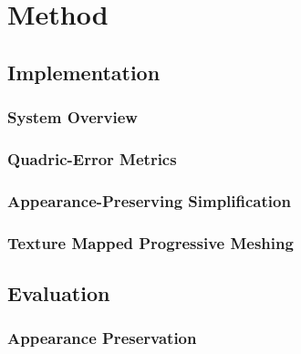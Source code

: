 
\chapter{Method} \label{cha:method}

    \section{Implementation} \label{sec:implementation}

        \subsection{System Overview} \label{sub:system_overview}

        \subsection{Quadric-Error Metrics} \label{sub:quadric_error_metrics}

        \subsection{Appearance-Preserving Simplification} \label{sub:appearance-preserving_simplification}

        \subsection{Texture Mapped Progressive Meshing} \label{sub:texture_mapped_progressive_meshing}

    \section{Evaluation} \label{sec:evaluation}

        \subsection{Appearance Preservation} \label{sub:appearance_preservation}

